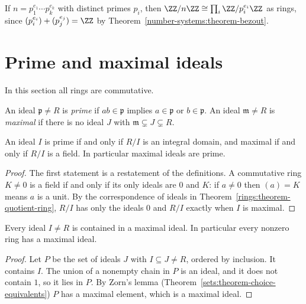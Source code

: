 \begin{example}\label{rings:example-crt-integers}
If $n = p_1^{e_1} \cdots p_k^{e_k}$ with distinct primes $p_i$, then
$\ZZ/n\ZZ \cong \prod_i \ZZ/p_i^{e_i}\ZZ$ as rings, since $(p_i^{e_i}) + (p_j^{e_j}) = \ZZ$ by
Theorem~\ref{number-systems:theorem-bezout}.
\end{example}

\section{Prime and maximal ideals}\label{rings:section-prime-maximal}

In this section all rings are commutative.

\begin{definition}\label{rings:definition-prime-maximal}
An ideal $\mathfrak{p} \neq R$ is \emph{prime} if $ab \in \mathfrak{p}$ implies $a \in \mathfrak{p}$
or $b \in \mathfrak{p}$. An ideal $\mathfrak{m} \neq R$ is \emph{maximal} if there is no ideal $J$
with $\mathfrak{m} \subsetneq J \subsetneq R$.
\end{definition}

\begin{proposition}\label{rings:proposition-prime-maximal-quotients}
An ideal $I$ is prime if and only if $R/I$ is an integral domain, and maximal if and
only if $R/I$ is a field. In particular maximal ideals are prime.
\end{proposition}

\begin{proof}
The first statement is a restatement of the definitions. A commutative ring
$K \neq 0$ is a field if and only if its only ideals are $0$ and $K$: if $a \neq 0$ then
$(a) = K$ means $a$ is a unit. By the correspondence of ideals in
Theorem~\ref{rings:theorem-quotient-ring}, $R/I$ has only the ideals $0$ and $R/I$
exactly when $I$ is maximal.
\end{proof}

\begin{theorem}[Krull]\label{rings:theorem-maximal-ideals-exist}
Every ideal $I \neq R$ is contained in a maximal ideal. In particular every nonzero
ring has a maximal ideal.
\end{theorem}

\begin{proof}
Let $P$ be the set of ideals $J$ with $I \subseteq J \neq R$, ordered by inclusion. It
contains $I$. The union of a nonempty chain in $P$ is an ideal, and it does not
contain $1$, so it lies in $P$. By Zorn's lemma
(Theorem~\ref{sets:theorem-choice-equivalents}) $P$ has a maximal element, which is
a maximal ideal.
\end{proof}

